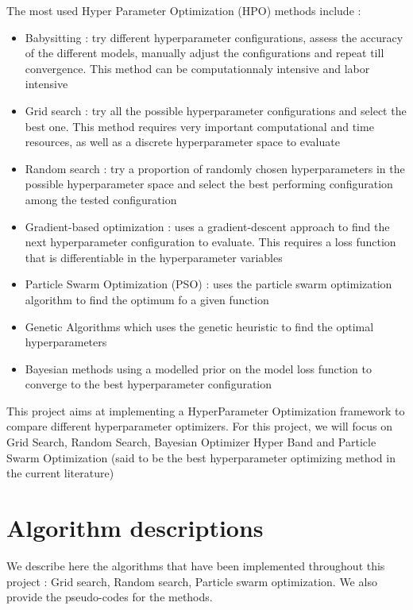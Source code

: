 \documentclass[a4 paper,11pt,2]{article}
\begin{document}
The most used Hyper Parameter Optimization (HPO) methods include
\cite{yangHyperparameterOptimizationMachine2020} :
\begin{itemize}
    \item Babysitting : try different hyperparameter configurations, assess the accuracy
          of the different models, manually adjust the configurations and repeat till
          convergence. This method can be computationnaly intensive and labor intensive
    \item Grid search : try all the possible hyperparameter configurations and select the
          best one. This method requires very important computational and time resources,
          as well as a discrete hyperparameter space to evaluate
    \item Random search : try a proportion of randomly chosen hyperparameters in the
          possible hyperparameter space and select the best performing configuration
          among the tested configuration
    \item Gradient-based optimization : uses a gradient-descent approach to find the next
          hyperparameter configuration to evaluate. This requires a loss function that is
          differentiable in the hyperparameter variables
    \item Particle Swarm Optimization (PSO) : uses the particle swarm optimization
          algorithm to find the optimum fo a given function
    \item Genetic Algorithms which uses the genetic heuristic to find the optimal
          hyperparameters
    \item Bayesian methods using a modelled prior on the model loss function to converge
          to the best hyperparameter configuration
\end{itemize}

This project aims at implementing a HyperParameter Optimization framework to
compare different hyperparameter optimizers. For this project, we will focus on
Grid Search, Random Search, Bayesian Optimizer Hyper Band and Particle Swarm
Optimization (said to be the best hyperparameter optimizing method in the
current literature)

\section{Algorithm descriptions}
We describe here the algorithms that have been implemented throughout this
project : Grid search, Random search, Particle swarm optimization. We also
provide the pseudo-codes for the methods.
\end{document}
